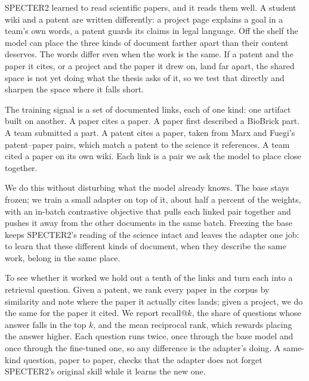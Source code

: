\documentclass[12pt,a4paper]{article}
\begin{document}
	SPECTER2 learned to read scientific papers, and it reads them well. A student
	wiki and a patent are written differently: a project page explains a goal in a
	team's own words, a patent guards its claims in legal language. Off the shelf the
	model can place the three kinds of document farther apart than their content
	deserves. The words differ even when the work is the same. If a patent and the
	paper it cites, or a project and the paper it drew on, land far apart, the shared
	space is not yet doing what the thesis asks of it, so we test that directly and
	sharpen the space where it falls short.
	
	The training signal is a set of documented links, each of one kind: one artifact
	built on another. A paper cites a paper. A paper first described a BioBrick part.
	A team submitted a part. A patent cites a paper, taken from Marx and Fuegi's
	patent--paper pairs, which match a patent to the science it references. A team
	cited a paper on its own wiki. Each link is a pair we ask the model to place close
	together.
	
	We do this without disturbing what the model already knows. The base stays frozen;
	we train a small adapter on top of it, about half a percent of the weights, with
	an in-batch contrastive objective that pulls each linked pair together and pushes
	it away from the other documents in the same batch. Freezing the base keeps
	SPECTER2's reading of the science intact and leaves the adapter one job: to learn
	that these different kinds of document, when they describe the same work, belong
	in the same place.
	
	To see whether it worked we hold out a tenth of the links and turn each into a
	retrieval question. Given a patent, we rank every paper in the corpus by
	similarity and note where the paper it actually cites lands; given a project, we
	do the same for the paper it cited. We report recall@$k$, the share of questions
	whose answer falls in the top $k$, and the mean reciprocal rank, which rewards
	placing the answer higher. Each question runs twice, once through the base model
	and once through the fine-tuned one, so any difference is the adapter's doing. A
	same-kind question, paper to paper, checks that the adapter does not forget
	SPECTER2's original skill while it learns the new one.
	
\end{document}
